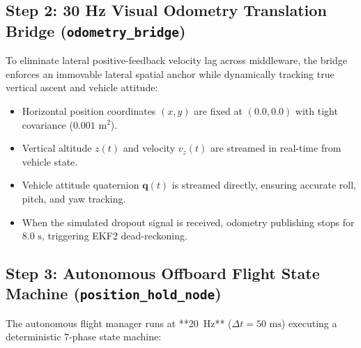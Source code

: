 \documentclass[11pt,a4paper]{article}
\begin{document}
\subsection{Step 2: 30 Hz Visual Odometry Translation Bridge (\texttt{odometry\_bridge})}
To eliminate lateral positive-feedback velocity lag across middleware, the bridge enforces an immovable lateral spatial anchor while dynamically tracking true vertical ascent and vehicle attitude:
\begin{itemize}[leftmargin=1.5em, itemsep=2pt]
  \item Horizontal position coordinates $(x, y)$ are fixed at $(0.0, 0.0)$ with tight covariance ($0.001\text{ m}^2$).
  \item Vertical altitude $z(t)$ and velocity $v_z(t)$ are streamed in real-time from vehicle state.
  \item Vehicle attitude quaternion $\mathbf{q}(t)$ is streamed directly, ensuring accurate roll, pitch, and yaw tracking.
  \item When the simulated dropout signal is received, odometry publishing stops for $8.0\text{ s}$, triggering EKF2 dead-reckoning.
\end{itemize}

\subsection{Step 3: Autonomous Offboard Flight State Machine (\texttt{position\_hold\_node})}
The autonomous flight manager runs at **20~Hz** ($\Delta t = 50\text{ ms}$) executing a deterministic 7-phase state machine:
\end{document}
